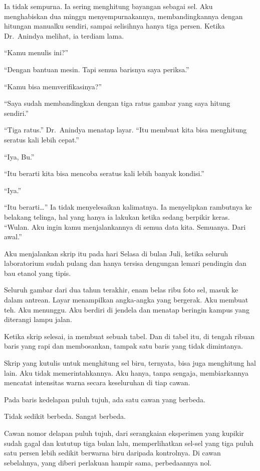 \documentclass[11pt,twoside,openany]{book}
\makeatletter
\newcommand{\scenebreak}{\par\vspace{0.9em}{\centering\textsc{*\hspace{0.7em}*\hspace{0.7em}*}\par}\vspace{0.9em}\@afterindentfalse\@afterheading}
\makeatother
\begin{document}
Ia tidak sempurna. Ia sering menghitung bayangan sebagai sel. Aku menghabiskan dua minggu menyempurnakannya, membandingkannya dengan hitungan manualku sendiri, sampai selisihnya hanya tiga persen. Ketika Dr.~Anindya melihat, ia terdiam lama.

``Kamu menulis ini?''

``Dengan bantuan mesin. Tapi semua barisnya saya periksa.''

``Kamu bisa memverifikasinya?''

``Saya sudah membandingkan dengan tiga ratus gambar yang saya hitung sendiri.''

``Tiga ratus.'' Dr.~Anindya menatap layar. ``Itu membuat kita bisa menghitung seratus kali lebih cepat.''

``Iya, Bu.''

``Itu berarti kita bisa mencoba seratus kali lebih banyak kondisi.''

``Iya.''

``Itu berarti\ldots{}'' Ia tidak menyelesaikan kalimatnya. Ia menyelipkan rambutnya ke belakang telinga, hal yang hanya ia lakukan ketika sedang berpikir keras. ``Wulan. Aku ingin kamu menjalankannya di semua data kita. Semuanya. Dari awal.''

\scenebreak
Aku menjalankan skrip itu pada hari Selasa di bulan Juli, ketika seluruh laboratorium sudah pulang dan hanya tersisa dengungan lemari pendingin dan bau etanol yang tipis.

Seluruh gambar dari dua tahun terakhir, enam belas ribu foto sel, masuk ke dalam antrean. Layar menampilkan angka-angka yang bergerak. Aku membuat teh. Aku menunggu. Aku berdiri di jendela dan menatap beringin kampus yang diterangi lampu jalan.

Ketika skrip selesai, ia membuat sebuah tabel. Dan di tabel itu, di tengah ribuan baris yang rapi dan membosankan, tampak satu baris yang tidak dimintanya.

Skrip yang kutulis untuk menghitung sel biru, ternyata, bisa juga menghitung hal lain. Aku tidak memerintahkannya. Aku hanya, tanpa sengaja, membiarkannya mencatat intensitas warna secara keseluruhan di tiap cawan.

Pada baris kedelapan puluh tujuh, ada satu cawan yang berbeda.

Tidak sedikit berbeda. Sangat berbeda.

Cawan nomor delapan puluh tujuh, dari serangkaian eksperimen yang kupikir sudah gagal dan kututup tiga bulan lalu, memperlihatkan sel-sel yang tiga puluh satu persen lebih sedikit berwarna biru daripada kontrolnya. Di cawan sebelahnya, yang diberi perlakuan hampir sama, perbedaannya nol.
\end{document}
